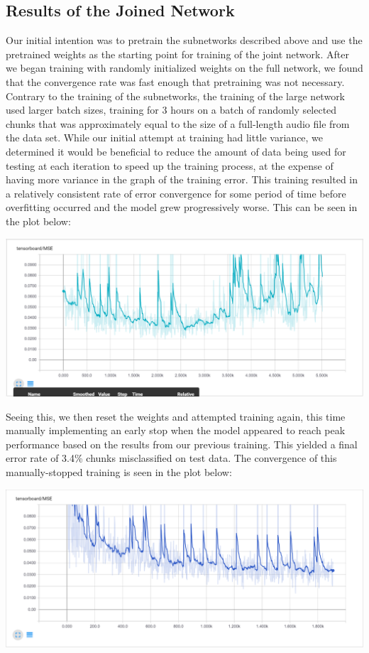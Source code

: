\documentclass[11pt]{article}
\begin{document}
\subsection{Results of the Joined Network}

Our initial intention was to pretrain the subnetworks described above and use the pretrained weights as the starting point for training of the joint network. After we began training with randomly initialized weights on the full network, we found that the convergence rate was fast enough that pretraining was not necessary. Contrary to the training of the subnetworks, the training of the large network used larger batch sizes, training for 3 hours on a batch of randomly selected chunks that was approximately equal to the size of a full-length audio file from the data set. While our initial attempt at training had little variance, we determined it would be beneficial to reduce the amount of data being used for testing at each iteration to speed up the training process, at the expense of having more variance in the graph of the training error. This training resulted in a relatively consistent rate of error convergence for some period of time before overfitting occurred and the model grew progressively worse. This can be seen in the plot below:

\includegraphics[width=\textwidth]{plotA.png}

Seeing this, we then reset the weights and attempted training again, this time manually implementing an early stop when the model appeared to reach peak performance based on the results from our previous training. This yielded a final error rate of 3.4\% chunks misclassified on test data. The convergence of this manually-stopped training is seen in the plot below:

\includegraphics[width=\textwidth]{plotC.png}
\end{document}
